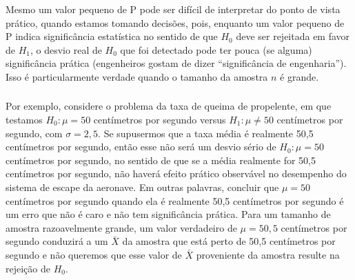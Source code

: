 \documentclass[14pt,aspectratio=1610]{beamer}
\newcommand{\Ho}{\ensuremath{H_{0}}}
\newcommand{\Hi}{\ensuremath{H_{1}}}
\begin{document}
\begin{frame}{}
\frametitle{}
\begin{block}{}
\justifying
Mesmo um valor pequeno de P pode ser difícil de interpretar do ponto de vista prático, quando estamos tomando decisões, pois, enquanto um valor pequeno de P 
indica significância estatística no sentido de que $\Ho$ deve ser rejeitada em favor de $\Hi$, o desvio real de $\Ho$ que foi detectado pode ter pouca (se alguma) 
significância prática (engenheiros gostam de dizer ``significância de engenharia''). Isso é particularmente verdade quando o tamanho da amostra $n$ é grande.
\end{block}
\end{frame}

\begin{frame}{}
\frametitle{}
\begin{block}{}
\justifying
Por exemplo, considere o problema da taxa de queima de propelente, em que testamos $\Ho: \mu = 50$ centímetros por segundo versus $\Hi: \mu\neq 50$ 
centímetros por segundo, com $\sigma = 2,5.$ Se supusermos que a taxa média é realmente 50,5 centímetros por segundo, então esse não será um desvio sério de 
$\Ho: \mu = 50$ centímetros por segundo, no sentido de que se a média realmente for 50,5 centímetros por segundo, não haverá efeito prático observável no desempenho 
do sistema de escape da aeronave. Em outras palavras, concluir que $\mu = 50$ centímetros por segundo quando ela é realmente 50,5 centímetros por segundo é um 
erro que não é caro e não tem significância prática. Para um tamanho de amostra razoavelmente grande, um valor verdadeiro de $ \mu= 50,5$ centímetros por segundo 
conduzirá a um $\bar{X}$ da amostra que está perto de 50,5 centímetros por segundo e não queremos que esse valor de $\bar{X}$ proveniente da amostra resulte na 
rejeição de $\Ho$.
\end{block}
\end{frame}
\end{document}

